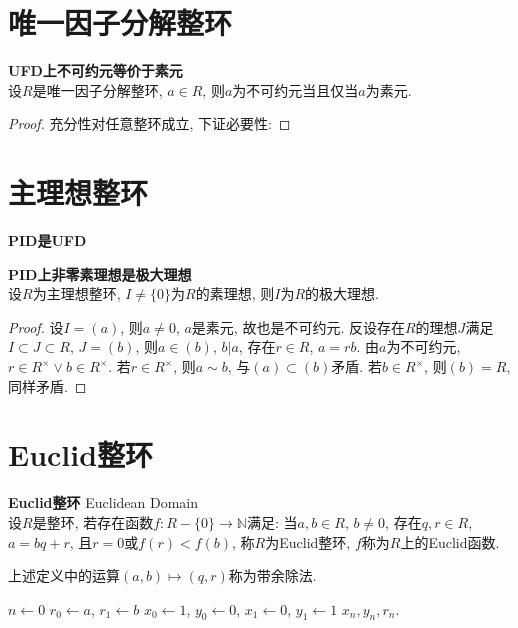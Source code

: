 \section{唯一因子分解整环}

\begin{pro} \textbf{UFD上不可约元等价于素元}\\
设$R$是唯一因子分解整环, $a\in R$, 则$a$为不可约元当且仅当$a$为素元.
\end{pro}
\begin{proof}
充分性对任意整环成立, 下证必要性: 
\end{proof}

\section{主理想整环}

\begin{pro} \textbf{PID是UFD}\\

\end{pro}

\begin{pro} \textbf{PID上非零素理想是极大理想}\\
设$R$为主理想整环, $I\neq \{0\}$为$R$的素理想, 则$I$为$R$的极大理想.  
\end{pro}
\begin{proof}
设$I=(a)$, 则$a\neq 0$, $a$是素元, 故也是不可约元. 反设存在$R$的理想$J$满足$I\subset J \subset R$, $J=(b)$, 则$a\in (b)$, $b|a$, 存在$r\in R$, $a=rb$. 由$a$为不可约元, $r\in R^\times \lor b\in R^\times$. 若$r\in R^\times$, 则$a\sim b$, 与$(a) \subset (b)$矛盾. 若$b\in R^\times$, 则$(b)=R$, 同样矛盾. 
\end{proof}

\section{Euclid整环}

\begin{dfn} \textbf{Euclid整环} Euclidean Domain\\
设$R$是整环, 若存在函数$f:R-\{0\} \to \mathbb{N}$满足: 当$a,b\in R$, $b\neq 0$, 存在$q,r\in R$, $a=bq+r$, 且$r=0$或$f(r)<f(b)$, 称$R$为Euclid整环, $f$称为$R$上的Euclid函数. 
\end{dfn}
上述定义中的运算$(a,b)\mapsto (q,r)$称为带余除法. 

\begin{algorithm}[ht!]
\caption{最大公因子的Euclid算法} 
\label{alg:gcd_Euclid}
$n\leftarrow 0$\;
$r_0\leftarrow a$, $r_1\leftarrow b$\;
$x_0\leftarrow 1$, $y_0\leftarrow 0$, $x_1\leftarrow 0$, $y_1\leftarrow 1$\;
\Return $x_n,y_n,r_n$.
\end{algorithm}

